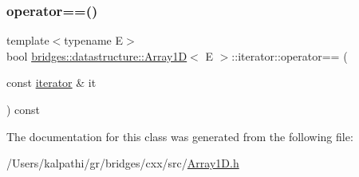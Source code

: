 \subsubsection{\texorpdfstring{operator==()}{operator==()}}
{\footnotesize\ttfamily template$<$typename E$>$ \\
bool \mbox{\hyperlink{classbridges_1_1datastructure_1_1_array1_d}{bridges\+::datastructure\+::\+Array1D}}$<$ E $>$\+::iterator\+::operator== (\begin{DoxyParamCaption}\item[{const \mbox{\hyperlink{classbridges_1_1datastructure_1_1_array1_d_1_1iterator}{iterator}} \&}]{it }\end{DoxyParamCaption}) const\hspace{0.3cm}{\ttfamily [inline]}}



The documentation for this class was generated from the following file\+:\begin{DoxyCompactItemize}
\item 
/\+Users/kalpathi/gr/bridges/cxx/src/\mbox{\hyperlink{_array1_d_8h}{Array1\+D.\+h}}\end{DoxyCompactItemize}

